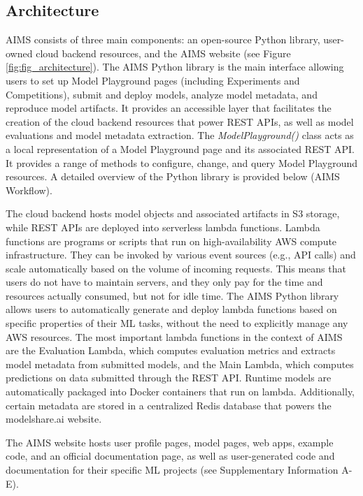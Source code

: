 \subsection{Architecture}
AIMS consists of three main components: an open-source Python library, user-owned cloud backend resources, and the AIMS website (see Figure \ref{fig:fig_architecture}). The AIMS Python library is the main interface allowing users to set up Model Playground pages (including Experiments and Competitions), submit and deploy models, analyze model metadata, and reproduce model artifacts. It provides an accessible layer that facilitates the creation of the cloud backend resources that power REST APIs, as well as model evaluations and model metadata extraction. The \textit{ModelPlayground()} class acts as a local representation of a Model Playground page and its associated REST API. It provides a range of methods to configure, change, and query Model Playground resources. A detailed overview of the Python library is provided below (AIMS Workflow). 

The cloud backend hosts model objects and associated artifacts in S3 storage, while REST APIs are deployed into serverless lambda functions. Lambda functions are programs or scripts that run on high-availability AWS compute infrastructure. They can be invoked by various event sources (e.g., API calls) and scale automatically based on the volume of incoming requests. This means that users do not have to maintain servers, and they only pay for the time and resources actually consumed, but not for idle time. The AIMS Python library allows users to automatically generate and deploy lambda functions based on specific properties of their ML tasks, without the need to explicitly manage any AWS resources. The most important lambda functions in the context of AIMS are the Evaluation Lambda, which computes evaluation metrics and extracts model metadata from submitted models, and the Main Lambda, which computes predictions on data submitted through the REST API. Runtime models are automatically packaged into Docker containers that run on lambda. Additionally, certain metadata are stored in a centralized Redis database that powers the modelshare.ai website.

The AIMS website hosts user profile pages, model pages, web apps, example code, and an official documentation page, as well as user-generated code and documentation for their specific ML projects (see Supplementary Information A-E). 


